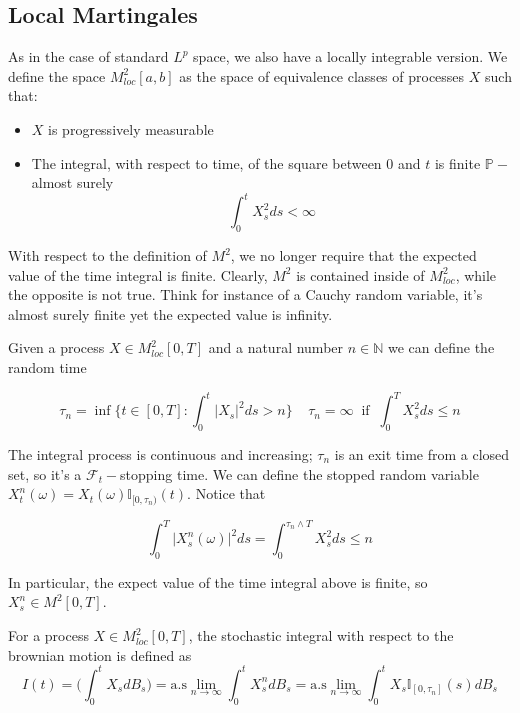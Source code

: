 \subsection{Local Martingales}
As in the case of standard $L^p$ space, we also have a locally integrable version. We define the space $M^2_{loc}[a,b]$ as the space of equivalence classes of processes $X$ such that:
\begin{itemize}
    \item $X$ is progressively measurable
    \item The integral, with respect to time, of the square between $0$ and $t$ is finite $\mathbb{P}-$almost surely
    \begin{equation*}
        \int_0^t X_s^2 ds < \infty
    \end{equation*}
\end{itemize}

With respect to the definition of $M^2$, we no longer require that the expected value of the time integral is finite. Clearly, $M^2$ is contained inside of $M^2_{loc}$, while the opposite is not true. Think for instance of a Cauchy random variable, it's almost surely finite yet the expected value is infinity. 

Given a process $X \in M^2_{loc}[0,T]$ and a natural number $n \in \mathbb{N}$ we can define the random time

\begin{equation*}
    \tau_n = \inf\Big\{ t \in [0,T] : \int_0^t \vert X_s \vert^2 ds > n \Big\} \;\;\;\; \tau_n = \infty \;\; \text{if} \;\; \int_0^T X_s^2 ds \leq n
\end{equation*}

The integral process is continuous and increasing; $\tau_n$ is an exit time from a closed set, so it's a $\mathcal{F}_t-$stopping time. We can define the stopped random variable $X_{t}^n(\omega) = X_t(\omega) \mathbb{I}_{[0,\tau_n)}(t)$. Notice that

\begin{equation*}
    \int_0^T \big\vert X_{s}^n(\omega) \big\vert^2 ds  = \int_0^{\tau_n \wedge T} X_s^2 ds \leq n 
\end{equation*}

In particular, the expect value of the time integral above is finite, so $X^n_s \in M^2[0,T]$. 

\begin{definition}
    For a process $X \in M^2_{loc}[0,T]$, the stochastic integral with respect to the brownian motion is defined as 
    \begin{equation*}
        I(t) = \Bigg( \int_0^t X_s dB_s \Bigg) = \text{a.s}\lim_{n \to \infty} \int_0^t X_s^n dB_s = \text{a.s}\lim_{n \to \infty} \int_0^t X_s \mathbb{I}_{[0,\tau_n]}(s) dB_s
    \end{equation*}
\end{definition}

